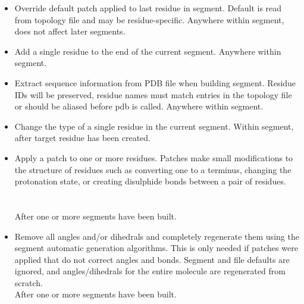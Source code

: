 \begin{itemize}
\item {}
{Override default patch applied to last residue in segment.
Default is read from topology file and may be residue-specific.}
{}
{Anywhere within segment, does not affect later segments.}

\item {}
{Add a single residue to the end of the current segment.}
{
}
{Anywhere within segment.}

\item {}
{Extract sequence information from PDB file when building segment.
Residue IDs will be preserved, residue names must match entries in
the topology file or should be aliased before pdb is called.}
{}
{Anywhere within segment.}

\item {}
{Change the type of a single residue in the current segment.}
{
}
{Within segment, after target residue has been created.}

\item {}
{Apply a patch to one or more residues.  Patches make small modifications to
the structure of residues such as converting one to a terminus, changing the
protonation state, or creating disulphide bonds between a pair of residues.}
{\\
\\
\\
}
{After one or more segments have been built.}

\item {}
{Remove all angles and/or dihedrals and completely regenerate them using
the segment automatic generation algorithms.  This is only needed if
patches were applied that do not correct angles and bonds.  Segment and
file defaults are ignored, and angles/dihedrals for the entire molecule
are regenerated from scratch.}
{\\
}
{After one or more segments have been built.}


\end{itemize}
